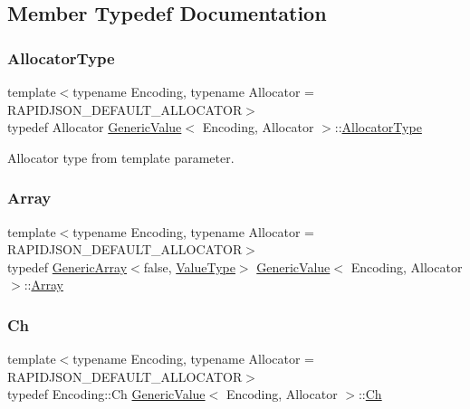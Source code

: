 \subsection{Member Typedef Documentation}
\mbox{\label{classGenericValue_a7beb83860c1b8d2a0e2a7da9796b2fa1}} 
\subsubsection{\texorpdfstring{Allocator\+Type}{AllocatorType}}
{\footnotesize\ttfamily template$<$typename Encoding, typename Allocator = R\+A\+P\+I\+D\+J\+S\+O\+N\+\_\+\+D\+E\+F\+A\+U\+L\+T\+\_\+\+A\+L\+L\+O\+C\+A\+T\+OR$>$ \\
typedef Allocator \hyperlink{classGenericValue}{Generic\+Value}$<$ Encoding, Allocator $>$\+::\hyperlink{classGenericValue_a7beb83860c1b8d2a0e2a7da9796b2fa1}{Allocator\+Type}}



Allocator type from template parameter. 

\mbox{\label{classGenericValue_a149e12992b8f6064c865a4cf55981b89}} 
\subsubsection{\texorpdfstring{Array}{Array}}
{\footnotesize\ttfamily template$<$typename Encoding, typename Allocator = R\+A\+P\+I\+D\+J\+S\+O\+N\+\_\+\+D\+E\+F\+A\+U\+L\+T\+\_\+\+A\+L\+L\+O\+C\+A\+T\+OR$>$ \\
typedef \hyperlink{classGenericArray}{Generic\+Array}$<$false, \hyperlink{classGenericValue_a43a39bb4fca9b9d3de3da6ac353d25ce}{Value\+Type}$>$ \hyperlink{classGenericValue}{Generic\+Value}$<$ Encoding, Allocator $>$\+::\hyperlink{classGenericValue_a149e12992b8f6064c865a4cf55981b89}{Array}}

\mbox{\label{classGenericValue_ade0e0ce64ccd5d852da57a35e720bafb}} 
\subsubsection{\texorpdfstring{Ch}{Ch}}
{\footnotesize\ttfamily template$<$typename Encoding, typename Allocator = R\+A\+P\+I\+D\+J\+S\+O\+N\+\_\+\+D\+E\+F\+A\+U\+L\+T\+\_\+\+A\+L\+L\+O\+C\+A\+T\+OR$>$ \\
typedef Encoding\+::\+Ch \hyperlink{classGenericValue}{Generic\+Value}$<$ Encoding, Allocator $>$\+::\hyperlink{classGenericValue_ade0e0ce64ccd5d852da57a35e720bafb}{Ch}}



